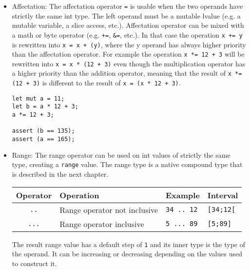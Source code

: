 \begin{itemize}
\item Affectation: The affectation operator \texttt{=} is usable when the two
  operands have strictly the same int type. The left operand must be a mutable
  lvalue (e.g. a mutable variable, a slice access, etc.). Affectation operator
  can be mixed with a math or byte operator (e.g. \texttt{+=}, \texttt{\&=},
  etc.). In that case the operation \texttt{x += y} is rewritten into \texttt{x
    = x + (y)}, where the y operand has always higher priority than the
  affectation operator. For example the operation \texttt{x *= 12 + 3} will be
  rewritten into \texttt{x = x * (12 + 3)} even though the multiplication
  operator has a higher priority than the addition operator, meaning that the
  result of \texttt{x *= (12 + 3)} is different to the result of \texttt{x = (x
    * 12 + 3)}.

  \begin{lstlisting}[style=coloredverbatim]
let mut a = 11;
let b = a * 12 + 3;
a *= 12 + 3;

assert (b == 135);
assert (a == 165);
  \end{lstlisting}

\item Range: The range operator can be used on int values of strictly the same type,
  creating a \texttt{range} value. The range type is a native compound type that is
  described in the next chapter.

  \begin{center}
    \vspace{-20pt}
    \begin{adjustbox}{max width=1.0\linewidth}
      \begin{tabular}{|c|lll|}
        \hline
        Operator & Operation & Example & Interval\\[0pt]
        \hline
        \texttt{..} & Range operator not inclusive & \texttt{34 .. 12} & \texttt{[34;12[}\\[0pt]
            \texttt{...} & Range operator inclusive & \texttt{5 ... 89} & \texttt{[5;89]}\\[0pt]
            \hline
      \end{tabular}
    \end{adjustbox}
  \end{center}

  The result range value has a default step of \texttt{1} and its inner type is the type
  of the operand. It can be increasing or decreasing depending on the values
  used to construct it.

\end{itemize}

